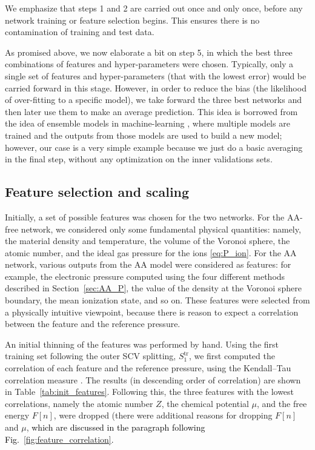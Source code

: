 \documentclass[%
 preprint,
 superscriptaddress,
 amsmath,amssymb,
longbibliography,
]{revtex4-2}
\newcommand{\change}[1]{\textcolor{black}{#1}}
\begin{document}
We emphasize that steps 1 and 2 are carried out once and only once, before any network training or feature selection begins. This ensures there is no contamination of training and test data. 

As promised above, we now elaborate a bit on step 5, in which the best three combinations of features and hyper-parameters were chosen. Typically, only a single set of features and hyper-parameters (that with the lowest error) would be carried forward in this stage. However, in order to reduce the bias (the likelihood of over-fitting to a specific model), we take forward the three best networks and then later use them to make an average prediction. This idea is borrowed from the idea of ensemble models in machine-learning \cite{Kittler1998}, where multiple models are trained and the outputs from those models are used to build a new model; however, our case is a very simple example because we just do a basic averaging in the final step, without any optimization on the inner validations sets.

\subsection{Feature selection and scaling}\label{sec:feature_scaling}

Initially, a set of possible features was chosen for the two networks. For the AA-free network, we considered only some fundamental physical quantities: namely, the material density and temperature, the volume of the Voronoi sphere, the atomic number, and the ideal gas pressure for the ions \eqref{eq:P_ion}. For the AA network, various outputs from the AA model were considered as features: for example, the electronic pressure computed using the four different methods described in Section~\ref{sec:AA_P}, the value of the density at the Voronoi sphere boundary, the mean ionization state, and so on. These features were selected from a physically intuitive viewpoint, because there is reason to expect a correlation between the feature and the reference pressure.

An initial thinning of the features was performed by hand. Using the first training set following the outer SCV splitting, $S_1^\textrm{tr}$, we first computed the correlation of each feature and the reference pressure, using the Kendall--Tau correlation measure \cite{kendall_tau}. The results (in descending order of correlation) are shown in Table~\ref{tab:init_features}. Following this, the three features with the lowest correlations, namely the atomic number $Z$, the chemical potential $\mu$, and the free energy $F[n]$, were dropped (there were additional reasons for dropping $F[n]$ and $\mu$, \change{which are discussed in the paragraph following Fig.~\ref{fig:feature_correlation}.}
\end{document}
